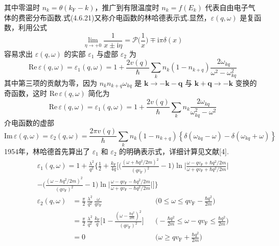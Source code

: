 其中零温时 $n_{k}=\theta(k_{\mathrm{F}}-k)$，推广到有限温度时 $n_{k}=f(E_{k})$ 代表自由电子气体的费密分布函数.式(4.6.21)又称介电函数的林哈德表示式.显然，$\varepsilon(q,\omega)$ 是复函数，利用公式
\begin{equation}
  \lim_{\eta\to+0}\frac{1}{x\pm\mathrm{i}\eta}
  =\mathcal{P}\Big(\frac{1}{x}\Big)\mp\mathrm{i}\pi\delta(x)
\end{equation}
容易求出 $\varepsilon(q,\omega)$ 的实部 $\varepsilon_{1}$ 与虚部 $\varepsilon_{2}$ 为
\begin{equation*}
  \mathrm{Re}\,\varepsilon(q,\omega)=\varepsilon_{1}(q,\omega)
  =1+\frac{2v(q)}{\hbar}\sum_{k}n_{k}\left(1-n_{k+q}\right)
  \frac{2\omega_{kq}}{\omega^{2}-\omega_{kq}^{2}}
\end{equation*}
其中第三项的贡献为零，因为 $n_{k}n_{k+q}\omega_{kq}$ 是 $\boldsymbol{k}\to-\boldsymbol{k}-\boldsymbol{q}$ 与 $\boldsymbol{k}+\boldsymbol{q}\to-\boldsymbol{k}$ 变换的奇函数，这时 $\mathrm{Re}\,\varepsilon(q,\omega)$ 简化为
\begin{equation}
  \mathrm{Re}\,\varepsilon(q,\omega)=\varepsilon_{1}(q,\omega)
  =1+\frac{2v(q)}{\hbar}\sum_{k}n_{k}
  \frac{2\omega_{kq}}{\omega_{kq}^{2}-\omega^{2}}
\end{equation}
介电函数的虚部
\begin{equation}
  \mathrm{Im}\,\varepsilon(q,\omega)=\varepsilon_{2}(q,\omega)
  =\frac{2\pi v(q)}{\hbar}\sum_{k}n_{k}\left(1-n_{k+q}\right)
  \left\{\delta(\omega_{kq}-\omega)-\delta(\omega_{kq}+\omega)\right\}
\end{equation}
1954年，林哈德首先算出了 $\varepsilon_{1}$ 和 $\varepsilon_{2}$ 的明确表示式，详细计算见文献[4].
\begin{equation}
\begin{aligned}
  \varepsilon_{1}(q,\omega)=1+\frac{\lambda^{2}}{q^{2}}
  \bigg\{\frac{1}{2}+\frac{k_{\mathrm{F}}}{4q}
  \bigg[\bigg(\frac{\left(\omega+\hbar q^{2}/2m\right)^{2}}{\left(qv_{\mathrm{F}}\right)^{2}}-1\bigg)
  \ln\bigg|\frac{\omega-qv_{\mathrm{F}}+\hbar q^{2}/2m}
  {\omega+qv_{\mathrm{F}}+\hbar q^{2}/2m}\bigg|\\
  -\bigg(\frac{\left(\omega-\hbar q^{2}/2m\right)^{2}}{\left(qv_{\mathrm{F}}\right)^{2}}-1\bigg)
  \ln\bigg|\frac{\omega-qv_{\mathrm{F}}-\hbar q^{2}/2m}
  {\omega+qv_{\mathrm{F}}-\hbar q^{2}/2m}\bigg|\bigg]\bigg\}
\end{aligned}
\end{equation}
\begin{equation}
\begin{aligned}
  \varepsilon_{2}(q,\omega)&=\frac{\pi}{2}\,\frac{\lambda^{2}}{q^{2}}\,
  \frac{\omega}{qv_{\mathrm{F}}}
  &&\bigg(0\leqslant\omega\leqslant qv_{\mathrm{F}}-\frac{\hbar q^{2}}{2m}\bigg)\\
  &=\frac{\pi}{2}\,\frac{\lambda^{2}}{q^{2}}\,\frac{k_{\mathrm{F}}}{q}
  \bigg[1-\frac{\left(\omega-\frac{\hbar q^{2}}{2m}\right)^{2}}
  {\left(qv_{\mathrm{F}}\right)^{2}}\bigg]
  &&\bigg(-\frac{\hbar q^{2}}{2m}\leqslant\omega-qv_{\mathrm{F}}\leqslant
  \frac{\hbar q^{2}}{2m}\bigg)\\
  &=0
  &&\bigg(\omega\geqslant qv_{\mathrm{F}}+\frac{\hbar q^{2}}{2m}\bigg)
\end{aligned}
\end{equation}
